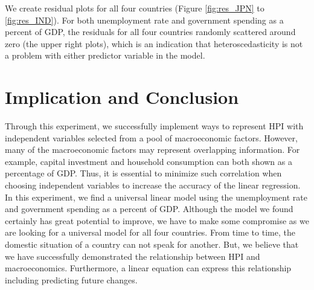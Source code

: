 \documentclass[11pt]{article}
\begin{document}
We create residual plots for all four countries (Figure \ref{fig:res_JPN} to \ref{fig:res_IND}). For both unemployment rate and government spending as a percent of GDP, the residuals for all four countries randomly scattered around zero (the upper right plots), which is an indication that heteroscedasticity is not a problem with either predictor variable in the model\citep{Residual1}.

\section{Implication and Conclusion}\label{conclusion}
Through this experiment, we successfully implement ways to represent HPI with independent variables selected from a pool of macroeconomic factors. However, many of the macroeconomic factors may represent overlapping information. For example, capital investment and household consumption can both shown as a percentage of GDP. Thus, it is essential to minimize such correlation when choosing independent variables to increase the accuracy of the linear regression. In this experiment, we find a universal linear model using the unemployment rate and government spending as a percent of GDP. Although the model we found certainly has great potential to improve, we have to make some compromise as we are looking for a universal model for all four countries. From time to time, the domestic situation of a country can not speak for another. But, we believe that we have successfully demonstrated the relationship between HPI and macroeconomics. Furthermore, a linear equation can express this relationship including predicting future changes. 

\newpage


\end{document}
